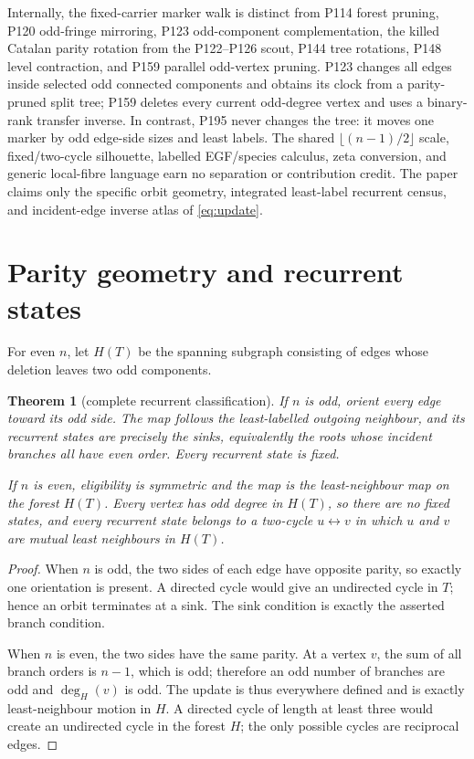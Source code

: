 \documentclass[a4paper,10pt]{amsart}
\newtheorem{theorem}{Theorem}[section]
\theoremstyle{remark}
\begin{document}
Internally, the fixed-carrier marker walk is distinct from P114 forest
pruning, P120 odd-fringe mirroring, P123 odd-component complementation, the
killed Catalan parity rotation from the P122--P126 scout, P144 tree rotations,
P148 level contraction, and P159 parallel odd-vertex pruning.  P123 changes
all edges inside selected odd connected components and obtains its clock from
a parity-pruned split tree; P159 deletes every current odd-degree vertex and
uses a binary-rank transfer inverse.  In contrast, P195 never changes the
tree: it moves one marker by odd edge-side sizes and least labels.  The shared
$\lfloor(n-1)/2\rfloor$ scale, fixed/two-cycle silhouette, labelled
EGF/species calculus, zeta conversion, and generic local-fibre language earn
no separation or contribution credit.  The paper claims only the specific
orbit geometry, integrated least-label recurrent census, and incident-edge
inverse atlas of \eqref{eq:update}.

\section{Parity geometry and recurrent states}

For even $n$, let $H(T)$ be the spanning subgraph consisting of edges whose
deletion leaves two odd components.

\begin{theorem}[complete recurrent classification]\label{thm:recurrent}
If $n$ is odd, orient every edge toward its odd side.  The map follows the
least-labelled outgoing neighbour, and its recurrent states are precisely
the sinks, equivalently the roots whose incident branches all have even
order.  Every recurrent state is fixed.

If $n$ is even, eligibility is symmetric and the map is the least-neighbour
map on the forest $H(T)$.  Every vertex has odd degree in $H(T)$, so there
are no fixed states, and every recurrent state belongs to a two-cycle
$u\leftrightarrow v$ in which $u$ and $v$ are mutual least neighbours in
$H(T)$.
\end{theorem}

\begin{proof}
When $n$ is odd, the two sides of each edge have opposite parity, so exactly
one orientation is present.  A directed cycle would give an undirected cycle
in $T$; hence an orbit terminates at a sink.  The sink condition is exactly
the asserted branch condition.

When $n$ is even, the two sides have the same parity.  At a vertex $v$, the
sum of all branch orders is $n-1$, which is odd; therefore an odd number of
branches are odd and $\deg_H(v)$ is odd.  The update is thus everywhere
defined and is exactly least-neighbour motion in $H$.  A directed cycle of
length at least three would create an undirected cycle in the forest $H$;
the only possible cycles are reciprocal edges.
\end{proof}
\end{document}

